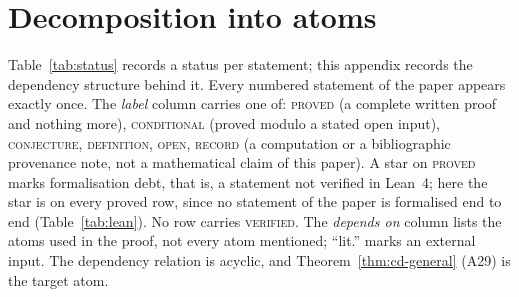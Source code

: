 \documentclass[11pt,a4paper]{article}
\theoremstyle{definition}
\theoremstyle{remark}
\theoremstyle{plain}
\begin{document}
\appendix

\section{Decomposition into atoms}\label{sec:atoms}

Table~\ref{tab:status} records a status per statement; this appendix records the dependency
structure behind it. Every numbered statement of the paper appears exactly once. The
\emph{label} column carries one of: \textsc{proved} (a complete written proof and nothing
more), \textsc{conditional} (proved modulo a stated open input), \textsc{conjecture},
\textsc{definition}, \textsc{open}, \textsc{record} (a computation or a bibliographic
provenance note, not a mathematical claim of this paper). A star on \textsc{proved} marks
formalisation debt, that is, a statement not verified in Lean~4; here the star is on every
proved row, since no statement of the paper is formalised end to end (Table~\ref{tab:lean}).
No row carries \textsc{verified}. The \emph{depends on} column lists the atoms used in the
proof, not every atom mentioned; ``lit.'' marks an external input. The dependency relation is
acyclic, and Theorem~\ref{thm:cd-general} (A29) is the target atom.
\end{document}
